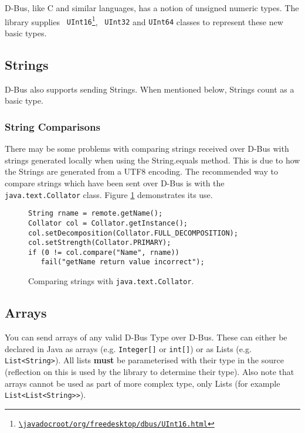 \documentclass[a4paper,12pt]{article}
\begin{document}
D-Bus, like C and similar languages, has a notion of unsigned numeric
types. The library supplies {\tt
UInt16\footnote{\url{\javadocroot/org/freedesktop/dbus/UInt16.html}}}, {\tt
UInt32} and {\tt UInt64} classes to represent these new basic types.

\subsection{Strings}

D-Bus also supports sending Strings. When mentioned below, Strings
count as a basic type.

\subsubsection{String Comparisons}

There may be some problems with comparing strings received over D-Bus with
strings generated locally when using the String.equals method. This is due to
how the Strings are generated from a UTF8 encoding. The recommended way to
compare strings which have been sent over D-Bus is with the {\tt
java.text.Collator} class. Figure \ref{fig:collator} demonstrates its use.

\begin{figure}[htb]
\begin{center}
\begin{verbatim}
String rname = remote.getName();
Collator col = Collator.getInstance();
col.setDecomposition(Collator.FULL_DECOMPOSITION);
col.setStrength(Collator.PRIMARY);
if (0 != col.compare("Name", rname))
   fail("getName return value incorrect");
\end{verbatim}
\end{center}
\caption{Comparing strings with {\tt java.text.Collator}.}
\label{fig:collator}
\end{figure}

\subsection{Arrays}

You can send arrays of any valid D-Bus Type over D-Bus. These can either be
declared in Java as arrays (e.g. \verb&Integer[]& or \verb&int[]&) or as Lists
(e.g. \verb&List<String>&). All lists {\bf must} be parameterised with their
type in the source (reflection on this is used by the library to determine
their type). Also note that arrays cannot be used as part of more complex type,
only Lists (for example \verb&List<List<String>>&).
\end{document}
